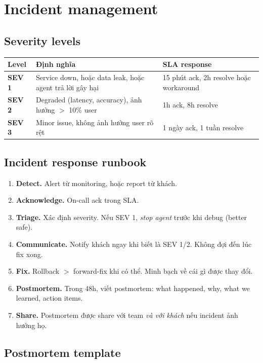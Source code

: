 \documentclass[11pt,a4paper]{article}
\begin{document}
\section{Incident management}

\subsection{Severity levels}

\begin{tabularx}{\linewidth}{@{}p{1.5cm} p{3.5cm} X@{}}
\toprule
\textbf{Level} & \textbf{Định nghĩa} & \textbf{SLA response} \\
\midrule
\textbf{SEV 1} & Service down, hoặc data leak, hoặc agent trả lời gây hại & 15 phút ack, 2h resolve hoặc workaround \\
\textbf{SEV 2} & Degraded (latency, accuracy), ảnh hưởng $>$ 10\% user & 1h ack, 8h resolve \\
\textbf{SEV 3} & Minor issue, không ảnh hưởng user rõ rệt & 1 ngày ack, 1 tuần resolve \\
\bottomrule
\end{tabularx}

\subsection{Incident response runbook}

\begin{enumerate}
\item \textbf{Detect.} Alert từ monitoring, hoặc report từ khách.
\item \textbf{Acknowledge.} On-call ack trong SLA.
\item \textbf{Triage.} Xác định severity. Nếu SEV 1, \textit{stop agent} trước khi debug (better safe).
\item \textbf{Communicate.} Notify khách ngay khi biết là SEV 1/2. Không đợi đến lúc fix xong.
\item \textbf{Fix.} Rollback $>$ forward-fix khi có thể. Minh bạch về cái gì được thay đổi.
\item \textbf{Postmortem.} Trong 48h, viết postmortem: what happened, why, what we learned, action items.
\item \textbf{Share.} Postmortem được share với team \textit{và với khách} nếu incident ảnh hưởng họ.
\end{enumerate}

\subsection{Postmortem template}
\end{document}
